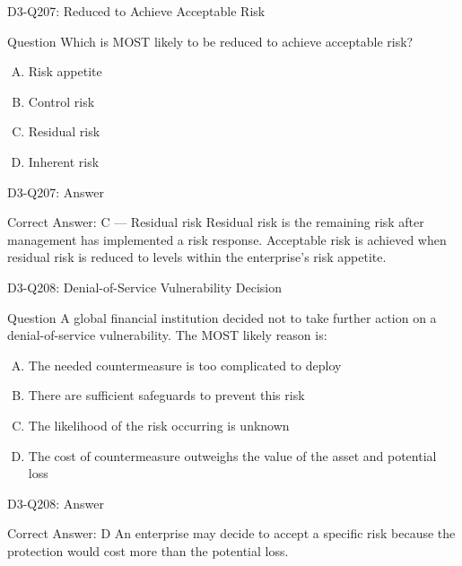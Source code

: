 \documentclass{beamer}
\begin{document}
	\begin{frame}{D3-Q207: Reduced to Achieve Acceptable Risk}
		\begin{block}{Question}
			Which is MOST likely to be reduced to achieve acceptable risk?
		\end{block}
		\begin{enumerate}[(A)]
			\item Risk appetite
			\item Control risk
			\item Residual risk
			\item Inherent risk
		\end{enumerate}
	\end{frame}
	\begin{frame}{D3-Q207: Answer}
		\begin{block}{Correct Answer: C --- Residual risk}
			Residual risk is the remaining risk after management has implemented a risk response. Acceptable risk is achieved when residual risk is reduced to levels within the enterprise's risk appetite.
		\end{block}
	\end{frame}
	
	\begin{frame}{D3-Q208: Denial-of-Service Vulnerability Decision}
		\begin{block}{Question}
			A global financial institution decided not to take further action on a denial-of-service vulnerability. The MOST likely reason is:
		\end{block}
		\begin{enumerate}[(A)]
			\item The needed countermeasure is too complicated to deploy
			\item There are sufficient safeguards to prevent this risk
			\item The likelihood of the risk occurring is unknown
			\item The cost of countermeasure outweighs the value of the asset and potential loss
		\end{enumerate}
	\end{frame}
	\begin{frame}{D3-Q208: Answer}
		\begin{block}{Correct Answer: D}
			An enterprise may decide to accept a specific risk because the protection would cost more than the potential loss.
		\end{block}
	\end{frame}
	
\end{document}
